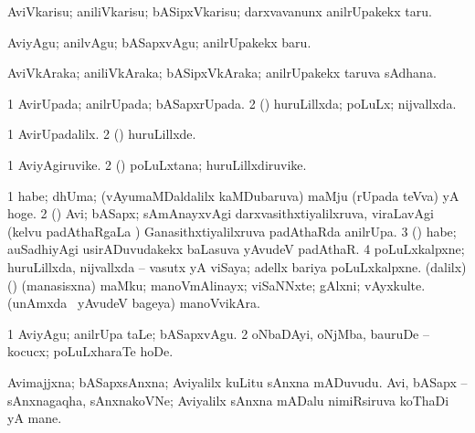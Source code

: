 \bentry
{} 
\gl{\sakirx}
\expl{}
\bmng
 AviVkarisu; aniliVkarisu; bASipxVkarisu; darxvavanunx anilrUpakekx taru. 
\emng

\noindent 
\gl{\akirx}
\expl{}
\bmng
 AviyAgu; anilvAgu; bASapxvAgu; anilrUpakekx baru. 
\emng
\eentry

\bentry
{} 
\gl{\nA}
\expl{}
\bmng
 AviVkAraka; aniliVkAraka; bASipxVkAraka; anilrUpakekx taruva sAdhana. 
\emng
\eentry

\bentry
{} 
\gl{\gu}
\expl{}
\bmng
\bnum
\num{1} AvirUpada; anilrUpada; bASapxrUpada. 
\num{2} (\rUpa) huruLillxda; poLuLx; nijvallxda. 
\enum
\emng
\eentry

\bentry
{} 
\gl{\kirxvi}
\expl{}
\bmng
\bnum
\num{1} AvirUpadalilx. 
\num{2} (\rUpa) huruLillxde. 
\enum
\emng
\eentry

\bentry
{} 
\gl{\nA}
\expl{}
\bmng
\bnum
\num{1} AviyAgiruvike. 
\num{2} (\rUpa) poLuLxtana; huruLillxdiruvike. 
\enum
\emng
\eentry

\bentry
{} 
\gl{\gu}
\expl{}
\bmng
\emng
\eentry

\bentry 
{} 
\gl{\nA}
\bmng
\bnum
\num{1} habe; dhUma; (vAyumaMDaldalilx kaMDubaruva) maMju (rUpada teVva) yA hoge. 
\num{2} (\Bwvi) Avi; bASapx; sAmAnayxvAgi darxvasithxtiyalilxruva, viraLavAgi (kelvu padAthaRgaLa \vi) Ganasithxtiyalilxruva padAthaRda anilrUpa. 
\num{3} (\veYshA) habe; auSadhiyAgi usirADuvudakekx baLasuva yAvudeV padAthaR. 
\num{4} poLuLxkalpxne; huruLillxda, nijvallxda -- vasutx yA viSaya;  adellx bariya poLuLxkalpxne. 
 (\bava dalilx) (\pArxparx) 
\banum
{} (manasisxna) maMku; manoVmAlinayx; viSaNNxte; gAlxni; vAyxkulte. 
 (unAmxda \mo\ yAvudeV bageya) manoVvikAra. 
\eanum
\numie
\enum
\emng
\eentry

\bentry
{} 
\gl{\akirx}
\expl{}
\bmng
\bnum
\num{1} AviyAgu; anilrUpa taLe; bASapxvAgu. 
\num{2} oNbaDAyi, oNjMba, bauruDe -- kocucx; poLuLxharaTe hoDe. 
\enum
\emng
\eentry

\bentry
{}
\gl{\nA}
\expl{}
\bmng
\banum
{} Avimajjxna; bASapxsAnxna; Aviyalilx kuLitu sAnxna mADuvudu. 
 Avi, bASapx -- sAnxnagaqha, sAnxnakoVNe; Aviyalilx sAnxna mADalu nimiRsiruva koThaDi yA mane. 
\eanum
\emng
\eentry

